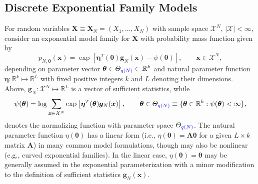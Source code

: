 \documentclass[numbib]{imamat}
\theoremstyle{theorem}
\theoremstyle{lemma}
\theoremstyle{example}
\theoremstyle{corollary}
\theoremstyle{definition}
\theoremstyle{remark}
\theoremstyle{approximation}
\theoremstyle{scheme}
\newcommand{\thetaidx}{q(N)}
\newcommand{\ak}[1]{{\color{blue} #1}}
\begin{document}
\hypertarget{discrete-exponential-family-models}{%
\subsection{Discrete Exponential Family Models}\label{discrete-exponential-family-models}}

For random variables \(\boldsymbol X \equiv\boldsymbol X_N= (X_1, \dots, X_N)\) with sample space \(\mathcal{X}^N\), \(|\mathcal{X}| < \infty\), consider an exponential \ak{model family} for \(\boldsymbol X\) with probability mass function given by
\begin{equation}
\label{eq:expo}
p_{N, \boldsymbol \theta}(\boldsymbol x) = \exp\left[\boldsymbol\eta^T(\boldsymbol \theta) \boldsymbol g_N(\boldsymbol x) - \psi(\boldsymbol \theta)\right], \qquad \boldsymbol x \in \mathcal{X}^N,
\end{equation}
depending on parameter vector \(\boldsymbol \theta \in \Theta_{\ak{\thetaidx}} \subset \mathbb{R}^{k}\) and natural parameter function \(\boldsymbol \eta : \mathbb{R}^k \mapsto \mathbb{R}^L\) with fixed positive integers \(k\) and \(L\) denoting their dimensions. Above, \(\boldsymbol g_N : \mathcal{X}^N \mapsto \mathbb{R}^L\) is a vector of sufficient statistics, while
\[
\psi(\boldsymbol \theta) = \log \sum\limits_{\boldsymbol x \in \mathcal{X}^N}\exp\left[\boldsymbol \eta^T(\boldsymbol \theta) \boldsymbol g_N(\boldsymbol x) \right], \qquad \boldsymbol \theta \in \Theta_\ak{\thetaidx}\equiv \{\boldsymbol \theta \in \mathbb{R}^k : \psi(\boldsymbol \theta) < \infty \},
\]
denotes the normalizing function with parameter space \(\Theta_{\ak{\thetaidx}}\). The natural parameter function \(\eta (\boldsymbol \theta)\) has a linear form (i.e., \(\eta (\boldsymbol \theta)= \bm{A} \boldsymbol \theta\) for a given \(L \times k\) matrix \(\bm{A}\)) in many common model formulations, though may also be nonlinear (e.g., curved exponential families). In the linear case, \(\eta (\boldsymbol \theta) = \boldsymbol \theta\) may be generally assumed in the exponential parameterization with a minor modification to the definition of sufficient statistics \(\boldsymbol g_N(\boldsymbol x)\).
\end{document}
